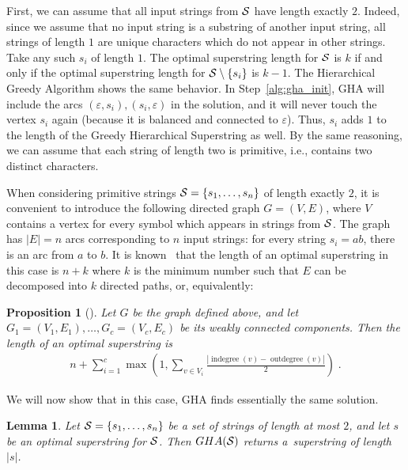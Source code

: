\documentclass[11pt]{article}
\newtheorem{lemma}{Lemma}
\newtheorem{proposition}{Proposition}
\DeclareMathOperator{\indegree}{indegree}
\DeclareMathOperator{\outdegree}{outdegree}
\begin{document}
First, we can assume that all input strings from ${\cal S}$ have length exactly $2$. Indeed, since we assume that no input string is a substring of another input string, all strings of length $1$ are unique characters which do not appear in other strings. Take any such $s_i$ of length $1$. The optimal superstring length for ${\cal S}$ is $k$ if and only if the optimal superstring length for ${\cal S}\setminus\{s_i\}$ is $k-1$. The Hierarchical Greedy Algorithm shows the same behavior. In Step~\ref{alg:gha_init}, GHA will include the arcs $(\varepsilon, s_i), (s_i, \varepsilon)$ in the solution, and it will never touch the vertex $s_i$ again (because it is balanced and connected to $\varepsilon$). Thus, $s_i$ adds $1$ to the length of the Greedy Hierarchical Superstring as well. By the same reasoning, we can assume that each string of length two is primitive, i.e., contains two distinct characters.

When considering primitive strings ${\cal S}=\{s_1,\ldots,s_n\}$ of length exactly $2$, it is convenient to introduce the following directed graph $G=(V, E)$, where $V$ contains a vertex for every symbol which appears in strings from ${\cal S}$. The graph has $|E|=n$ arcs corresponding to $n$ input strings: for every string $s_i=ab$, there is an arc from $a$ to $b$. It is known~\cite{GMS1980} that the length of an optimal superstring in this case is $n+k$ where $k$ is the minimum number such that $E$ can be decomposed into $k$ directed paths, or, equivalently:
\begin{proposition}[\cite{GMS1980}]
Let $G$ be the graph defined above, and let $G_1=(V_1,E_1),\ldots,G_c=(V_c,E_c)$ be its weakly connected components. Then the length of an optimal superstring is
\begin{align}
\label{eq:gms}
n + \sum_{i=1}^{c} {\max\left( 1, \sum_{v \in V_i}{ \frac{ |\indegree(v) - \outdegree(v)|}{2} }\right)} \; .
\end{align}
\end{proposition}

We will now show that in this case, GHA finds essentially the same solution.

\begin{lemma}
Let ${\cal S}=\{s_1,\ldots,s_n\}$ be a set of strings of length at most $2$, and let $s$ be an optimal superstring for ${\cal S}$. Then $GHA({\cal S})$ returns a~superstring of length~$|s|$. 
\end{lemma}
\end{document}
